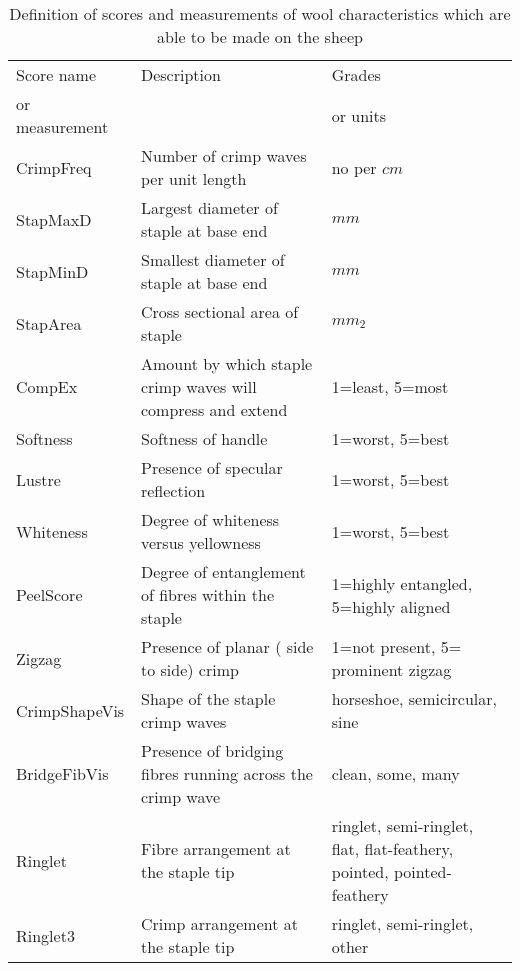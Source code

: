 %

\begin{table}[htp]
\centering
\caption{Definition of scores and measurements of wool characteristics which are able to be made on the sheep}
\label{tab:scores}
\vspace{0.1in}
\begin{tabular}{|p{1.0in}|p{2.5in}|p{0.9in}|}  \hline
     Score name & Description  & Grades  \\ 
  or measurement  &    & or units  \\ \hline
  CrimpFreq    & Number of crimp waves per unit length  & no per $cm$ \\
  StapMaxD     & Largest diameter of staple  at base end    & $mm$        \\
  StapMinD     & Smallest diameter of staple at base end    & $mm$        \\
  StapArea     & Cross sectional area of staple         & $mm_{2}$    \\ \hline
  CompEx       & Amount by which staple crimp waves will compress and extend  & 1=least, 5=most  \\
  Softness     & Softness of handle                     & 1=worst, 5=best   \\
  Lustre       & Presence of specular reflection        & 1=worst, 5=best   \\
  Whiteness    & Degree of whiteness versus yellowness  & 1=worst, 5=best   \\
  PeelScore    & Degree of entanglement of fibres  within the staple   &   1=highly entangled, 5=highly aligned   \\
  Zigzag       & Presence of planar ( side to side) crimp     & 1=not present, 5= prominent zigzag              \\ \hline
  CrimpShapeVis & Shape of the staple crimp waves    & horseshoe, semicircular, sine \\
  BridgeFibVis  & Presence of bridging fibres running across the crimp wave & clean, some, many \\ \hline
  Ringlet      & Fibre arrangement at the staple tip & ringlet, semi-ringlet, flat, flat-feathery, pointed, pointed-feathery \\
  Ringlet3     & Crimp arrangement at the staple tip & ringlet, semi-ringlet, other \\ \hline
\end{tabular}
\end{table}

%
